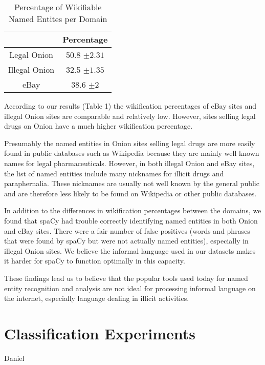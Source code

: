 \documentclass[11pt,a4paper]{article}
\begin{document}
\begin{table}

\caption{Percentage of Wikifiable Named Entites per Domain}

\begin{centering}
\begin{tabular}{|c||c|}
\hline 
 & Percentage\tabularnewline
\hline 
\hline 
Legal Onion & 50.8 $\pm2.31$\tabularnewline
\hline 
\hline 
Illegal Onion & 32.5 $\pm1.35$\tabularnewline
\hline 
\hline 
eBay & 38.6 $\pm2$\tabularnewline
\hline 
\end{tabular}
\par\end{centering}
\end{table}
According to our results (Table 1) the wikification percentages of
eBay sites and illegal Onion sites are comparable and relatively low.
However, sites selling legal drugs on Onion have a much higher wikification
percentage.

Presumably the named entities in Onion sites selling legal drugs are
more easily found in public databases such as Wikipedia because they
are mainly well known names for legal pharmaceuticals. However, in
both illegal Onion and eBay sites, the list of named entities include
many nicknames for illicit drugs and paraphernalia. These nicknames
are usually not well known by the general public and are therefore
less likely to be found on Wikipedia or other public databases.

In addition to the differences in wikification percentages between
the domains, we found that spaCy had trouble correctly identifying
named entities in both Onion and eBay sites. There were a fair number
of false positives (words and phrases that were found by spaCy but
were not actually named entities), especially in illegal Onion sites.
We believe the informal language used in our datasets makes it harder
for spaCy to function optimally in this capacity.

These findings lead us to believe that the popular tools used today
for named entity recognition and analysis are not ideal for processing
informal language on the internet, especially language dealing in
illicit activities. 

\section{Classification Experiments}

Daniel
\end{document}
